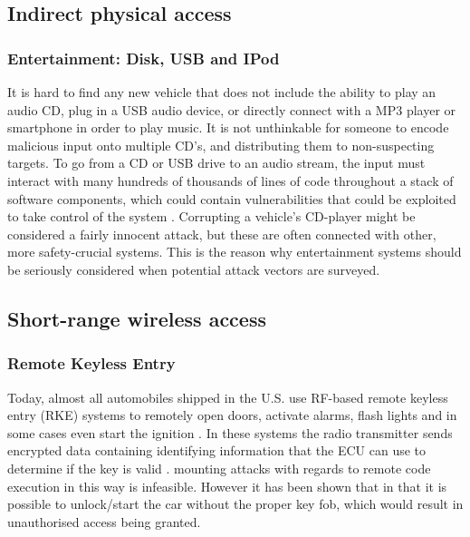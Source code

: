 \subsection{Indirect physical access}
\label{subsec:indirect_physical_access}

\subsubsection{Entertainment: Disk, USB and IPod} 
\label{subsubsec:entertainment}
It is hard to find any new vehicle that does not include the ability to play an audio CD, plug in a USB audio device, or directly connect with a MP3 player or smartphone in order to play music. It is not unthinkable for someone to encode malicious input onto multiple CD's, and distributing them to non-suspecting targets. To go from a CD or USB drive to an audio stream, the input must interact with many hundreds of thousands of lines of code throughout a stack of software components, which could contain vulnerabilities that could be exploited to take control of the system \cite{Pike15}. Corrupting a vehicle's CD-player might be considered a fairly innocent attack, but these are often connected with other, more safety-crucial systems. This is the reason why entertainment systems should be seriously considered when potential attack vectors are surveyed.

\subsection{Short-range wireless access}
\label{subsec:short-range_wireless_access}

\subsubsection{Remote Keyless Entry}
\label{subsubsec:rke}

Today, almost all automobiles shipped in the U.S. use RF-based remote keyless entry (RKE) systems to remotely open doors, activate alarms, flash lights and in some cases even start the ignition \cite{Kosher}. In these systems the radio transmitter sends encrypted data containing identifying information that the ECU can use to determine if the key is valid \cite{MillerA}. mounting attacks with regards to remote code execution in this way is infeasible. However it has been shown that in \cite{KeeLoq} that it is possible to unlock/start the car without the proper key fob, which would result in unauthorised access being granted.

